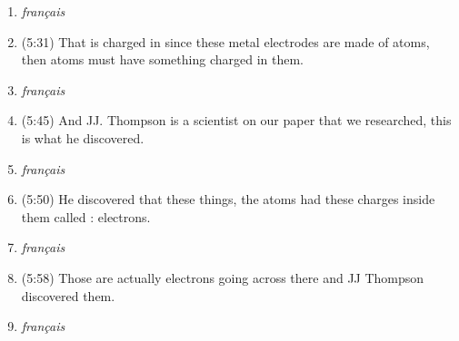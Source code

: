 \documentclass[../main.tex]{subfiles}
\begin{document}
\begin{enumerate}
     \item \hspace*{1cm} \emph{ français }
    \item (5:31) That is charged in since these metal electrodes are made of atoms, then atoms must have something charged in them.
     \item \hspace*{1cm} \emph{ français }
    \item (5:45) And JJ. Thompson is a scientist on our paper that we researched, this is what he discovered.
     \item \hspace*{1cm} \emph{ français }
    \item (5:50) He discovered that these things, the atoms had these charges inside them called : electrons.
     \item \hspace*{1cm} \emph{ français }
    \item (5:58) Those are actually electrons going across there and JJ Thompson discovered them.
     \item \hspace*{1cm} \emph{ français }
     
\end{enumerate}
\end{document}
